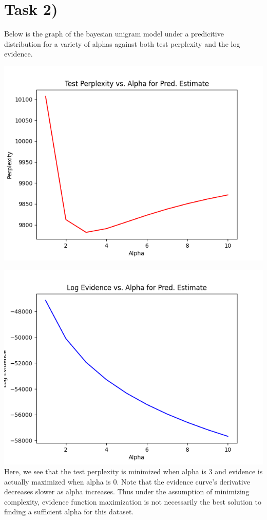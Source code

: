 \documentclass{article}
\begin{document}
\section*{Task 2)}

Below is the graph of the bayesian unigram model under a predicitive distribution for a variety of alphas against both test perplexity and the log evidence.

\includegraphics[width=\textwidth]{../output/task2pp.png}

\includegraphics[width=\textwidth]{../output/task2evid.png}
Here, we see that the test perplexity is minimized when alpha is 3 and evidence is actually maximized when alpha is 0. Note that the evidence curve's derivative decreases slower as alpha increases. Thus under the assumption of minimizing complexity, evidence function maximization is not necessarily the best solution to finding a sufficient alpha for this dataset.
\end{document}
